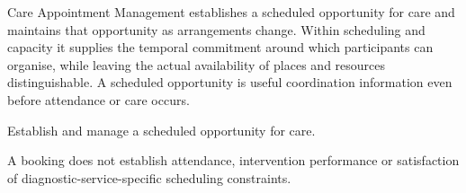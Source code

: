 Care Appointment Management establishes a scheduled opportunity for care and maintains that opportunity as arrangements change. Within scheduling and capacity it supplies the temporal commitment around which participants can organise, while leaving the actual availability of places and resources distinguishable. A scheduled opportunity is useful coordination information even before attendance or care occurs.



Establish and manage a scheduled opportunity for care.



A booking does not establish attendance, intervention performance or satisfaction of diagnostic-service-specific scheduling constraints.



